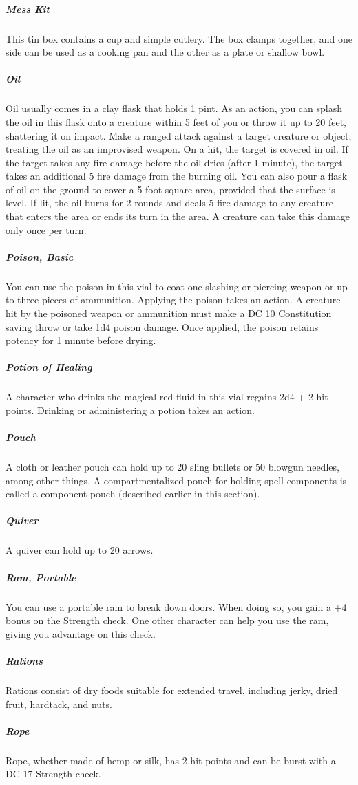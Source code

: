 \subparagraph*{Mess Kit} This tin box contains a cup and simple cutlery. The box clamps together, and one side can be used as a cooking pan and the other as a plate or shallow bowl.

\subparagraph*{Oil} Oil usually comes in a clay flask that holds 1 pint. As an action, you can splash the oil in this flask onto a creature within 5 feet of you or throw it up to 20 feet, shattering it on impact. Make a ranged attack against a target creature or object, treating the oil as an improvised weapon. On a hit, the target is covered in oil. If the target takes any fire damage before the oil dries (after 1 minute), the target takes an additional 5 fire damage from the burning oil. You can also pour a flask of oil on the ground to cover a 5-foot-square area, provided that the surface is level. If lit, the oil burns for 2 rounds and deals 5 fire damage to any creature that enters the area or ends its turn in the area. A creature can take this damage only once per turn.

\subparagraph*{Poison, Basic} You can use the poison in this vial to coat one slashing or piercing weapon or up to three pieces of ammunition. Applying the poison takes an action. A creature hit by the poisoned weapon or ammunition must make a DC 10 Constitution saving throw or take 1d4 poison damage. Once applied, the poison retains potency for 1 minute before drying.

\subparagraph*{Potion of Healing} A character who drinks the magical red fluid in this vial regains 2d4 + 2 hit points. Drinking or administering a potion takes an action.

\subparagraph*{Pouch} A cloth or leather pouch can hold up to 20 sling bullets or 50 blowgun needles, among other things. A compartmentalized pouch for holding spell components is called a component pouch (described earlier in this section). 

\subparagraph*{Quiver} A quiver can hold up to 20 arrows.

\subparagraph*{Ram, Portable} You can use a portable ram to break down doors. When doing so, you gain a +4 bonus on the Strength check. One other character can help you use the ram, giving you advantage on this check.

\subparagraph*{Rations} Rations consist of dry foods suitable for extended travel, including jerky, dried fruit, hardtack, and nuts.

\subparagraph*{Rope} Rope, whether made of hemp or silk, has 2 hit points and can be burst with a DC 17 Strength check.

